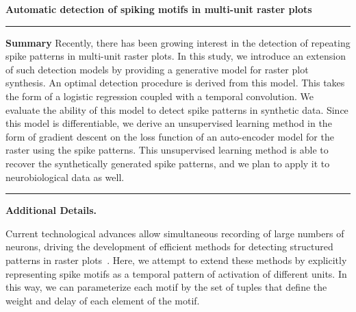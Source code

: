 \documentclass[11pt]{article}
\begin{document}
{\Large\bf 
Automatic detection of spiking motifs in multi-unit raster plots
}

\hrule
\textbf{Summary} %
Recently, there has been growing interest in the detection of repeating spike patterns in multi-unit raster plots. In this study, we introduce an extension of such detection models by providing a generative model for raster plot synthesis. An optimal detection procedure is derived from this model. This takes the form of a logistic regression coupled with a temporal convolution. We evaluate the ability of this model to detect spike patterns in synthetic data. Since this model is differentiable, we derive an unsupervised learning method in the form of gradient descent on the loss function of an auto-encoder model for the raster using the spike patterns. This unsupervised learning method is able to recover the synthetically generated spike patterns, and we plan to apply it to neurobiological data as well.
\vspace{.5cm}
\hrule
\textbf{Additional Details.}%


Current technological advances allow simultaneous recording of large numbers of neurons, driving the development of efficient methods for detecting structured patterns in raster plots~\parencite{russo_cell_2017, stella_3d-spade_2019}. Here, we attempt to extend these methods by explicitly representing spike motifs as a temporal pattern of activation of different units. In this way, we can parameterize each motif by the set of tuples that define the weight and delay of each element of the motif. 
\end{document}

